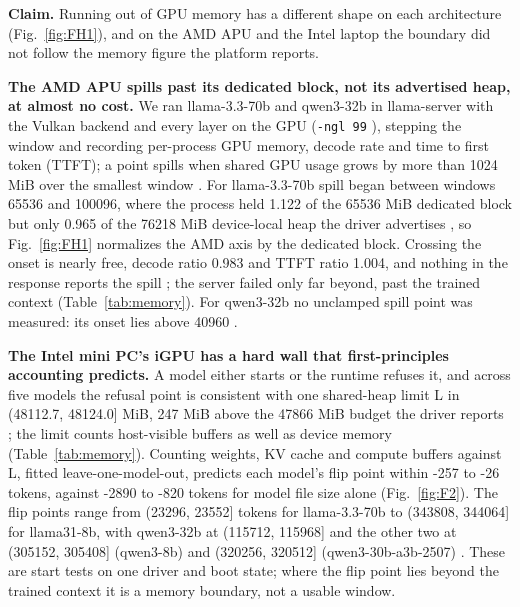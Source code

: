 \documentclass[conference,10pt]{IEEEtran}
\begin{document}
\textbf{Claim.} Running out of GPU memory has a different shape on each architecture (Fig.~\ref{fig:FH1}), and on the AMD APU and the Intel laptop the boundary did not follow the memory figure the platform reports.

\textbf{The AMD APU spills past its dedicated block, not its advertised heap, at almost no cost.} We ran llama-3.3-70b and qwen3-32b in llama-server with the Vulkan backend and every layer on the GPU (\texttt{-ngl 99}%
), stepping the window and recording per-process GPU memory, decode rate and time to first token (TTFT); a point spills when shared GPU usage grows by more than 1024 MiB over the smallest window%
. For llama-3.3-70b spill began between windows 65536 and 100096, where the process held 1.122 of the 65536 MiB dedicated block but only 0.965 of the 76218 MiB device-local heap the driver advertises%
, so Fig.~\ref{fig:FH1} normalizes the AMD axis by the dedicated block. Crossing the onset is nearly free, decode ratio 0.983 and TTFT ratio 1.004, and nothing in the response reports the spill%
; the server failed only far beyond, past the trained context (Table~\ref{tab:memory}). For qwen3-32b no unclamped spill point was measured: its onset lies above 40960%
.

\textbf{The Intel mini PC's iGPU has a hard wall that first-principles accounting predicts.} A model either starts or the runtime refuses it, and across five models the refusal point is consistent with one shared-heap limit L in (48112.7, 48124.0] MiB, 247 MiB above the 47866 MiB budget the driver reports%
; the limit counts host-visible buffers as well as device memory (Table~\ref{tab:memory}). Counting weights, KV cache and compute buffers against L, fitted leave-one-model-out, predicts each model's flip point within -257 to -26 tokens, against -2890 to -820 tokens for model file size alone %
(Fig.~\ref{fig:F2}). The flip points range from (23296, 23552] tokens for llama-3.3-70b to (343808, 344064] for llama31-8b, with qwen3-32b at (115712, 115968] and the other two at (305152, 305408] (qwen3-8b) and (320256, 320512] (qwen3-30b-a3b-2507)%
. These are start tests on one driver and boot state; where the flip point lies beyond the trained context it is a memory boundary, not a usable window.
\end{document}
